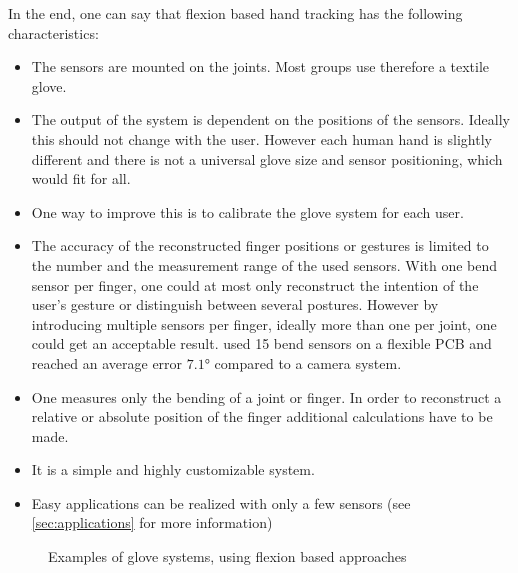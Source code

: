 In the end, one can say that flexion based hand tracking has the following characteristics:\\
\begin{itemize}
\item The sensors are mounted on the joints. Most groups use therefore a textile glove. 
\item The output of the system is dependent on the positions of the sensors. Ideally this should not change with the user. However each human hand is slightly different and there is not a universal glove size and sensor positioning, which would fit for all.
\item One way to improve this is to calibrate the glove system for each user.
\item The accuracy of the reconstructed finger positions or gestures is limited to the number and the measurement range of the used sensors. With one bend sensor per finger, one could at most only reconstruct the intention of the user's gesture or distinguish between several postures. However by introducing multiple sensors per finger, ideally more than one per joint, one could get an acceptable result. \cite{zecca2007development} used 15 bend sensors on a flexible PCB and reached an average error $ \ang{7.1} $  compared to a camera system.
\item One measures only the bending of a joint or finger. In order to reconstruct a relative or absolute position of the finger additional calculations have to be made.
\item It is a simple and highly customizable system.
\item Easy applications can be realized with only a few sensors (see \ref{sec:applications} for more information)
\end{itemize}

\begin{figure}[h]
	\hfill
	\hfill
	
	\caption{Examples of glove systems, using flexion based approaches}
	\label{fig:examplesFlexion}
\end{figure}


